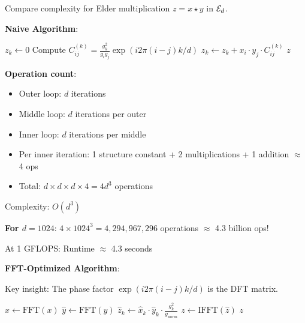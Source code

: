 \begin{example}
Compare complexity for Elder multiplication $z = x \star y$ in $\mathcal{E}_{d}$.

\textbf{Naive Algorithm}:

\begin{algorithmic}[1]
     
        \State $z_k \leftarrow 0$
         
             
                \State Compute $C_{ij}^{(k)} = \frac{g_k^2}{g_ig_j} \exp(i2\pi(i-j)k/d)$
                \State $z_k \leftarrow z_k + x_i \cdot y_j \cdot C_{ij}^{(k)}$
            \EndFor
        \EndFor
    \EndFor
    \State \Return $z$
\EndProcedure
\end{algorithmic}

\textbf{Operation count}:
\begin{itemize}
\item Outer loop: $d$ iterations
\item Middle loop: $d$ iterations per outer
\item Inner loop: $d$ iterations per middle
\item Per inner iteration: 1 structure constant + 2 multiplications + 1 addition $\approx$ 4 ops
\item Total: $d \times d \times d \times 4 = 4d^3$ operations
\end{itemize}

Complexity: $O(d^3)$

\textbf{For $d=1024$}: $4 \times 1024^3 = 4,294,967,296$ operations $\approx$ 4.3 billion ops!

At 1 GFLOPS: Runtime $\approx$ 4.3 seconds

\textbf{FFT-Optimized Algorithm}:

Key insight: The phase factor $\exp(i2\pi(i-j)k/d)$ is the DFT matrix.

\begin{algorithmic}[1]
    \State $\hat{x} \leftarrow \text{FFT}(x)$ 
    \State $\hat{y} \leftarrow \text{FFT}(y)$ 
     
        \State $\hat{z}_k \leftarrow \hat{x}_k \cdot \hat{y}_k \cdot \frac{g_k^2}{g_{\text{norm}}}$
    \EndFor
    \State $z \leftarrow \text{IFFT}(\hat{z})$ 
    \State \Return $z$
\EndProcedure
\end{algorithmic}


\end{example}
